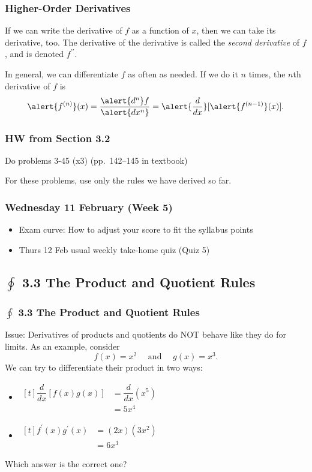 \documentclass[14pt]{beamer}
\begin{document}
\begin{frame}
\frametitle{Higher-Order Derivatives}
If we can write the derivative of $f$ as a function of $x$, then we can take its derivative, too.  The derivative of the derivative is called the \emph{\alert{second derivative}} of $f$, and is denoted $f^{\prime\prime}$.  

In general, we can differentiate $f$ as often as needed.  If we do it $n$ times, the $n$th derivative of $f$ is 
\[\alert{f^{(n)}}(x)=\dfrac{\alert{d^n} f}{\alert{dx^n}}=\alert{\dfrac{d}{dx}}[\alert{f^{(n-1)}}(x)].\]
\end{frame}

\begin{frame}
\frametitle{HW from Section 3.2}
Do problems 3-45 (x3) (pp.\ 142--145 in textbook)

\vspace{1pc}
For these problems, use only the rules we have derived so far.
\end{frame}


\begin{frame}
\frametitle{Wednesday 11 February (Week 5)}
\begin{itemize}
\item Exam curve: How to adjust your score to fit the syllabus points
\item Thurs 12 Feb usual weekly take-home quiz (Quiz 5)
\end{itemize}
\end{frame}

\begin{frame}
\subsection[3.3 The Product and Quotient Rules]{$\oint$ 3.3 The Product and Quotient Rules}
\frametitle{$\oint$ 3.3 The Product and Quotient Rules}
\footnotesize
Issue: Derivatives of products and quotients do \alert{NOT} behave like they do for limits.  As an example, consider 
\[f(x)=x^2\quad\text{ and }\quad g(x)=x^3.\]
We can try to differentiate their product in two ways:
\begin{itemize}
\item $\begin{aligned}[t]
	\dfrac{d}{dx}[f(x)g(x)] &= \dfrac{d}{dx}\left(x^5 \right) \\[0.25pc]
	 &= 5x^4
	\end{aligned}$
\item $\begin{aligned}[t]
	f^{\prime}(x)g^{\prime}(x) &= (2x)(3x^2) \\
	 &= 6x^3
	 \end{aligned}$
\end{itemize}
\begin{que}Which answer is the correct one? \end{que}
\end{frame}
\end{document}
